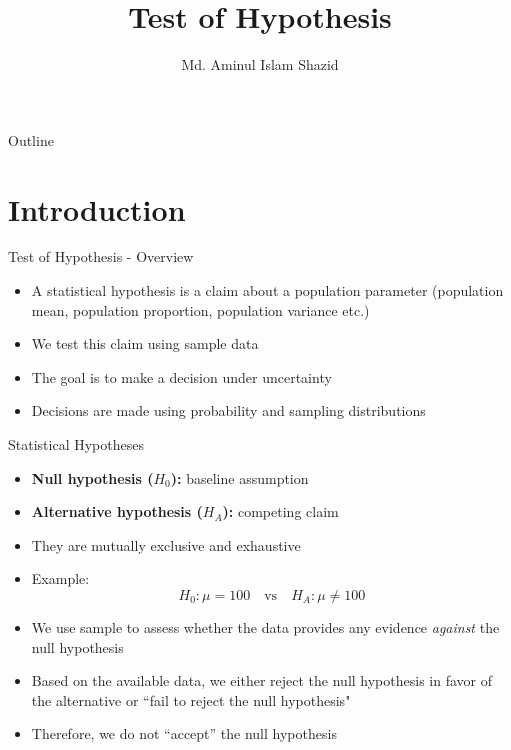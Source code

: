 \documentclass[12pt, aspectratio=169]{beamer}
\title{Test of Hypothesis}
\author{Md. Aminul Islam Shazid}
\date{}
\begin{document}
    {
		\addtocounter{framenumber}{-2}

		\begin{frame}
			\titlepage
		\end{frame}

		\begin{frame}{Outline}
            \vfill
			\tableofcontents[subsectionstyle=hide]
            \vfill
		\end{frame}
	}

    \section{Introduction}


    \begin{frame}{Test of Hypothesis - Overview}
        \begin{itemize}
            \item A statistical hypothesis is a claim about a population parameter (population mean, population proportion, population variance etc.)
            \item We test this claim using sample data
            \item The goal is to make a decision under uncertainty
            \item Decisions are made using probability and sampling distributions
        \end{itemize}
    \end{frame}


    \begin{frame}{Statistical Hypotheses}
        \begin{itemize}
            \item \textbf{Null hypothesis ($H_0$):} baseline assumption
            \item \textbf{Alternative hypothesis ($H_A$):} competing claim
            \item They are mutually exclusive and exhaustive
            \item Example:
            \[
            H_0: \mu = 100 \quad \text{vs} \quad H_A: \mu \neq 100
            \]
            \item We use sample to assess whether the data provides any evidence \emph{against} the null hypothesis
            \item Based on the available data, we either reject the null hypothesis in favor of the alternative or ``fail to reject the null hypothesis"
            \item Therefore, we do not ``accept'' the null hypothesis
        \end{itemize}
    \end{frame}
\end{document}
